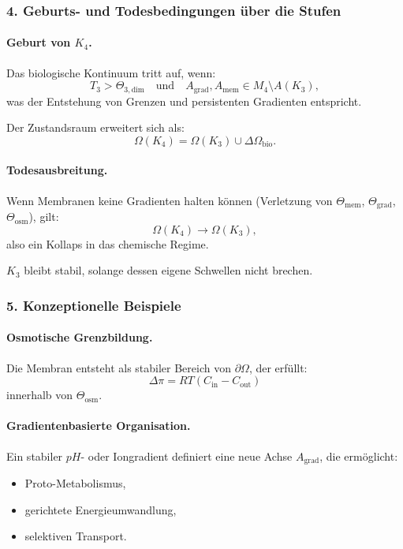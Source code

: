 \subsubsection{4. Geburts- und Todesbedingungen über die Stufen}

\paragraph{Geburt von \texorpdfstring{$K_4$}{K_4}.}
Das biologische Kontinuum tritt auf, wenn:
\[
T_3 > \Theta_{3,\mathrm{dim}}
\quad \text{und} \quad
A_{\mathrm{grad}}, A_{\mathrm{mem}} \in M_4 \setminus A(K_3),
\]
was der Entstehung von Grenzen und persistenten Gradienten entspricht.

Der Zustandsraum erweitert sich als:
\[
\Omega(K_4) = \Omega(K_3) \cup \Delta\Omega_{\mathrm{bio}}.
\]

\paragraph{Todesausbreitung.}
Wenn Membranen keine Gradienten halten können (Verletzung von
$\Theta_{\mathrm{mem}}$, $\Theta_{\mathrm{grad}}$, $\Theta_{\mathrm{osm}}$), gilt:
\[
\Omega(K_4) \rightarrow \Omega(K_3),
\]
also ein Kollaps in das chemische Regime.

$K_3$ bleibt stabil, solange dessen eigene Schwellen nicht brechen.

\subsubsection{5. Konzeptionelle Beispiele}

\paragraph{Osmotische Grenzbildung.}
Die Membran entsteht als stabiler Bereich von $\partial\Omega$, der erfüllt:
\[
\Delta\pi = RT(C_{\mathrm{in}} - C_{\mathrm{out}})
\]
innerhalb von $\Theta_{\mathrm{osm}}$.

\paragraph{Gradientenbasierte Organisation.}
Ein stabiler $pH$- oder Iongradient definiert eine neue Achse
$A_{\mathrm{grad}}$, die ermöglicht:
\begin{itemize}
  \item Proto-Metabolismus,
  \item gerichtete Energieumwandlung,
  \item selektiven Transport.
\end{itemize}

